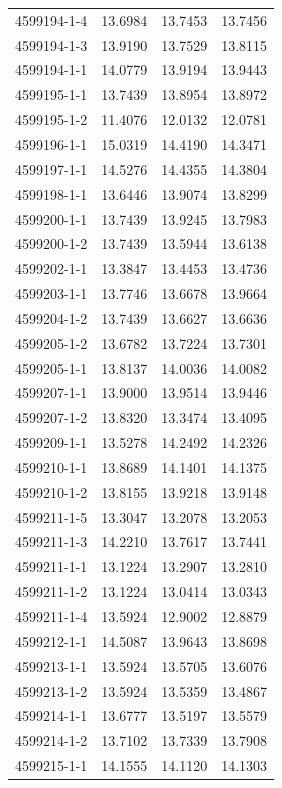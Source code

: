 \begin{longtable}{lrrr}
4599194-1-4 & 13.6984 & 13.7453 & 13.7456 \\
4599194-1-3 & 13.9190 & 13.7529 & 13.8115 \\
4599194-1-1 & 14.0779 & 13.9194 & 13.9443 \\
4599195-1-1 & 13.7439 & 13.8954 & 13.8972 \\
4599195-1-2 & 11.4076 & 12.0132 & 12.0781 \\
4599196-1-1 & 15.0319 & 14.4190 & 14.3471 \\
4599197-1-1 & 14.5276 & 14.4355 & 14.3804 \\
4599198-1-1 & 13.6446 & 13.9074 & 13.8299 \\
4599200-1-1 & 13.7439 & 13.9245 & 13.7983 \\
4599200-1-2 & 13.7439 & 13.5944 & 13.6138 \\
4599202-1-1 & 13.3847 & 13.4453 & 13.4736 \\
4599203-1-1 & 13.7746 & 13.6678 & 13.9664 \\
4599204-1-2 & 13.7439 & 13.6627 & 13.6636 \\
4599205-1-2 & 13.6782 & 13.7224 & 13.7301 \\
4599205-1-1 & 13.8137 & 14.0036 & 14.0082 \\
4599207-1-1 & 13.9000 & 13.9514 & 13.9446 \\
4599207-1-2 & 13.8320 & 13.3474 & 13.4095 \\
4599209-1-1 & 13.5278 & 14.2492 & 14.2326 \\
4599210-1-1 & 13.8689 & 14.1401 & 14.1375 \\
4599210-1-2 & 13.8155 & 13.9218 & 13.9148 \\
4599211-1-5 & 13.3047 & 13.2078 & 13.2053 \\
4599211-1-3 & 14.2210 & 13.7617 & 13.7441 \\
4599211-1-1 & 13.1224 & 13.2907 & 13.2810 \\
4599211-1-2 & 13.1224 & 13.0414 & 13.0343 \\
4599211-1-4 & 13.5924 & 12.9002 & 12.8879 \\
4599212-1-1 & 14.5087 & 13.9643 & 13.8698 \\
4599213-1-1 & 13.5924 & 13.5705 & 13.6076 \\
4599213-1-2 & 13.5924 & 13.5359 & 13.4867 \\
4599214-1-1 & 13.6777 & 13.5197 & 13.5579 \\
4599214-1-2 & 13.7102 & 13.7339 & 13.7908 \\
4599215-1-1 & 14.1555 & 14.1120 & 14.1303 \\

\end{longtable}
